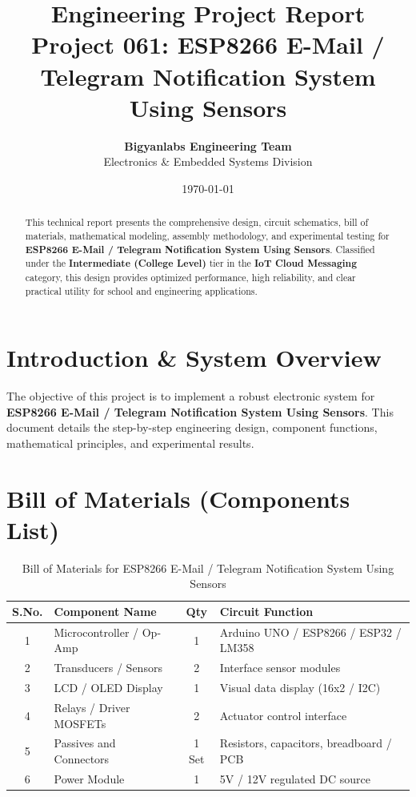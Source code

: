 \documentclass[11pt,a4paper]{article}
\title{\textbf{\Huge Engineering Project Report}\\[0.5em] \Large Project 061: ESP8266 E-Mail / Telegram Notification System Using Sensors}
\author{\textbf{Bigyanlabs Engineering Team}\\ Electronics \& Embedded Systems Division}
\date{\today}
\begin{document}
\maketitle
\thispagestyle{empty}

\begin{abstract}
This technical report presents the comprehensive design, circuit schematics, bill of materials, mathematical modeling, assembly methodology, and experimental testing for \textbf{ESP8266 E-Mail / Telegram Notification System Using Sensors}. Classified under the \textbf{Intermediate (College Level)} tier in the \textbf{IoT Cloud Messaging} category, this design provides optimized performance, high reliability, and clear practical utility for school and engineering applications.
\end{abstract}

\newpage
\tableofcontents
\newpage

\section{Introduction \& System Overview}
The objective of this project is to implement a robust electronic system for \textbf{ESP8266 E-Mail / Telegram Notification System Using Sensors}. This document details the step-by-step engineering design, component functions, mathematical principles, and experimental results.

\section{Bill of Materials (Components List)}
\begin{table}[h!]
\centering
\caption{Bill of Materials for ESP8266 E-Mail / Telegram Notification System Using Sensors}
\vspace{0.5em}
\begin{tabular}{clcp{7cm}}
\toprule
\textbf{S.No.} & \textbf{Component Name} & \textbf{Qty} & \textbf{Circuit Function} \\
\midrule
1 & Microcontroller / Op-Amp & 1 & Arduino UNO / ESP8266 / ESP32 / LM358 \\
2 & Transducers / Sensors & 2 & Interface sensor modules \\
3 & LCD / OLED Display & 1 & Visual data display (16x2 / I2C) \\
4 & Relays / Driver MOSFETs & 2 & Actuator control interface \\
5 & Passives and Connectors & 1 Set & Resistors, capacitors, breadboard / PCB \\
6 & Power Module & 1 & 5V / 12V regulated DC source \\
\bottomrule
\end{tabular}
\end{table}
\end{document}
